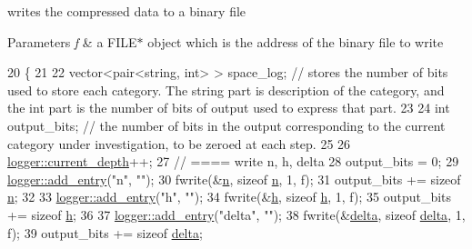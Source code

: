 writes the compressed data to a binary file 


\begin{DoxyParams}{Parameters}
{\em f} & a {\ttfamily F\+I\+L\+E$\ast$} object which is the address of the binary file to write \\
\hline
\end{DoxyParams}

\begin{DoxyCode}
20                                                  \{
21 
22   vector<pair<string, int> > space\_log; \textcolor{comment}{// stores the number of bits used to store each category. The
       string part is description of the category, and the int part is the number of bits of output used to express that
       part.}
23 
24   \textcolor{keywordtype}{int} output\_bits; \textcolor{comment}{// the number of bits in the output corresponding to the current category under
       investigation, to be zeroed at each step.}
25 
26   \hyperlink{classlogger_a9d29b49bd318a719a8e85b59eac54fe0}{logger::current\_depth}++;
27   \textcolor{comment}{// ==== write n, h, delta}
28   output\_bits = 0;
29   \hyperlink{classlogger_a710163deb17bc81f70d53d285b8ac9ac}{logger::add\_entry}(\textcolor{stringliteral}{"n"}, \textcolor{stringliteral}{""});
30   fwrite(&\hyperlink{classmarked__graph__compressed_a8d841016ddb11cfd33748c8deb6277ba}{n}, \textcolor{keyword}{sizeof} \hyperlink{classmarked__graph__compressed_a8d841016ddb11cfd33748c8deb6277ba}{n}, 1, f);
31   output\_bits += \textcolor{keyword}{sizeof} \hyperlink{classmarked__graph__compressed_a8d841016ddb11cfd33748c8deb6277ba}{n};
32 
33   \hyperlink{classlogger_a710163deb17bc81f70d53d285b8ac9ac}{logger::add\_entry}(\textcolor{stringliteral}{"h"}, \textcolor{stringliteral}{""});
34   fwrite(&\hyperlink{classmarked__graph__compressed_af6ff623407b673d08d0cab77b39c2193}{h}, \textcolor{keyword}{sizeof} \hyperlink{classmarked__graph__compressed_af6ff623407b673d08d0cab77b39c2193}{h}, 1, f);
35   output\_bits += \textcolor{keyword}{sizeof} \hyperlink{classmarked__graph__compressed_af6ff623407b673d08d0cab77b39c2193}{h};
36 
37   \hyperlink{classlogger_a710163deb17bc81f70d53d285b8ac9ac}{logger::add\_entry}(\textcolor{stringliteral}{"delta"}, \textcolor{stringliteral}{""});
38   fwrite(&\hyperlink{classmarked__graph__compressed_a8b2aaac68e9332ddc78d88eb60b323a7}{delta}, \textcolor{keyword}{sizeof} \hyperlink{classmarked__graph__compressed_a8b2aaac68e9332ddc78d88eb60b323a7}{delta}, 1, f);
39   output\_bits += \textcolor{keyword}{sizeof} \hyperlink{classmarked__graph__compressed_a8b2aaac68e9332ddc78d88eb60b323a7}{delta};

\end{DoxyCode}
